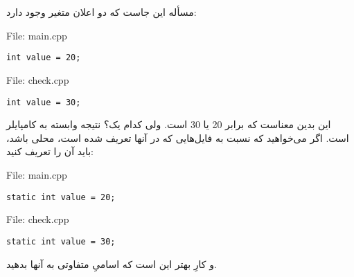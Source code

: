 \section{}
\paragraph{}\label{answer:57}
مسأله این جاست که دو اعلان متغیر وجود دارد:
\begin{LTR}
    File: main.cpp
    \begin{lstlisting}[style=C++Style]
        int value = 20;
    \end{lstlisting}
\end{LTR}

\begin{LTR}
    File: check.cpp
    \begin{lstlisting}[style=C++Style]
        int value = 30;
    \end{lstlisting}
\end{LTR}

این بدین معناست که  برابر 20 یا 30 است. ولی کدام یک؟ نتیجه وابسته به کامپایلر است. اگر می‌خواهید که  نسبت به فایل‌هایی که در آنها تعریف شده است، محلی باشد، باید آن را  تعریف کنید:
\begin{LTR}
    File: main.cpp
    \begin{lstlisting}[style=C++Style]
        static int value = 20;
    \end{lstlisting}
\end{LTR}

\begin{LTR}
    File: check.cpp
    \begin{lstlisting}[style=C++Style]
        static int value = 30;
    \end{lstlisting}
\end{LTR}

و کارِ بهتر این است که اسامیِ متفاوتی به آنها بدهید.